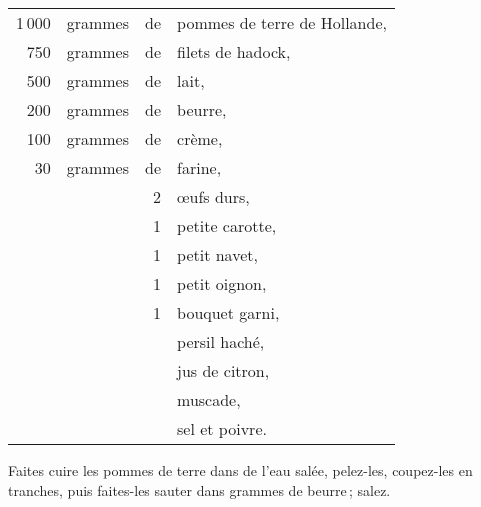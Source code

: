 \footnotesize
\begin{longtable}{rrrp{16em}}
  1 000 & grammes & de & pommes de terre de Hollande,                                                     \\
    750 & grammes & de & filets de hadock,                                                                \\
    500 & grammes & de & lait,                                                                            \\
    200 & grammes & de & beurre,                                                                          \\
    100 & grammes & de & crème,                                                                           \\
     30 & grammes & de & farine,                                                                          \\
        &         &  2 & œufs durs,                                                                       \\
        &         &  1 & petite carotte,                                                                  \\
        &         &  1 & petit navet,                                                                     \\
        &         &  1 & petit oignon,                                                                    \\
        &         &  1 & bouquet garni,                                                                   \\
        &         &    & persil haché,                                                                    \\
        &         &    & jus de citron,                                                                   \\
        &         &    & muscade,                                                                         \\
        &         &    & sel et poivre.                                                                   \\
\end{longtable}
\normalsize


Faites cuire les pommes de terre dans de l'eau salée, pelez-les, coupez-les en
tranches, puis faites-les sauter dans {\mmm} grammes de beurre ; salez.


